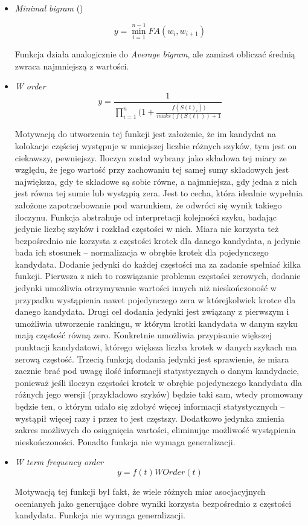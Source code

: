 \documentclass[11pt,a4paper]{llncs}
\begin{document}
\begin{itemize}
\item \emph{Minimal bigram} (\cite{paradowski_beta})

$$ y = \min^{n-1}_{i=1}FA(w_{i}, w_{i+1}) $$


Funkcja działa analogicznie do \emph{Average bigram}, ale zamiast obliczać średnią zwraca najmniejszą z wartości.

\item \emph{W order}
$$ y = \frac{1}{\prod_{i=1}^{n} (1 + \frac{f(S(t)_{i}))}{maks(f(S(t))) + 1}} $$

\par
Motywacją do utworzenia tej funkcji jest założenie, że im kandydat na kolokacje częściej występuje w mniejszej liczbie różnych szyków, tym jest on ciekawszy, pewniejszy.
Iloczyn został wybrany jako składowa tej miary ze względu, że jego wartość przy zachowaniu tej samej sumy składowych jest największa, gdy te składowe są sobie równe, a najmniejsza, gdy jedna z nich jest równa tej sumie lub wystąpią zera.
Jest to cecha, która idealnie wypełnia założone zapotrzebowanie pod warunkiem, że odwróci się wynik takiego iloczynu.
Funkcja abstrahuje od interpretacji kolejności szyku, badając jedynie liczbę szyków i rozkład częstości w nich.
Miara nie korzysta też bezpośrednio nie korzysta z częstości krotek dla danego kandydata, a jedynie bada ich stosunek -- normalizacja w obrębie krotek dla pojedynczego kandydata.
Dodanie jedynki do każdej częstości ma za zadanie spełniać kilka funkcji.
Pierwsza z nich to rozwiązanie problemu częstości zerowych, dodanie jedynki umożliwia otrzymywanie wartości innych niż nieskończoność w przypadku wystąpienia nawet pojedynczego zera w którejkolwiek krotce dla danego kandydata.
Drugi cel dodania jedynki jest związany z pierwszym i umożliwia utworzenie rankingu, w którym krotki kandydata w danym szyku mają częstość równą zero.
Konkretnie umożliwia przypisanie większej punktacji kandydatowi, którego większa liczba krotek w danych szykach ma zerową częstość.
Trzecią funkcją dodania jedynki jest sprawienie, że miara zacznie brać pod uwagę ilość informacji statystycznych o danym kandydacie, ponieważ jeśli iloczyn częstości krotek w obrębie pojedynczego kandydata dla różnych jego wersji (przykładowo szyków) będzie taki sam, wtedy promowany będzie ten, o którym udało się zdobyć więcej informacji statystycznych -- wystąpił więcej razy i przez to jest częstszy.
Dodatkowo jedynka zmienia zakres możliwych do osiągnięcia wartości, eliminując możliwość wystąpienia nieskończoności.
Ponadto funkcja nie wymaga generalizacji.


\item \emph{W term frequency order}
$$ y = f(t) WOrder(t) $$

\par
Motywacją tej funkcji był fakt, że wiele różnych miar asocjacyjnych ocenianych jako generujące dobre wyniki korzysta bezpośrednio z częstości kandydata.
Funkcja nie wymaga generalizacji.

\end{itemize}
\end{document}
